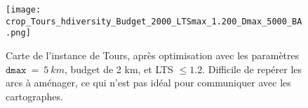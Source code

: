 
\begin{figure}[H]
    \centering
    \texttt{[image: crop\_Tours\_hdiversity\_Budget\_2000\_LTSmax\_1.200\_Dmax\_5000\_BA.png]}
    \caption{Carte de l'instance de Tours, après optimisation avec les paramètres $\texttt{dmax}~=~5~km$, budget de 2 km, et LTS $\leq 1.2$. Difficile de repérer les arcs à aménager, ce qui n'est pas idéal pour communiquer avec les cartographes.}
    \label{fig:cartetours}
\end{figure}



